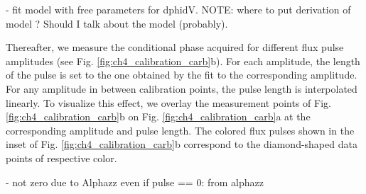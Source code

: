 - fit model with free parameters for dphidV. NOTE: where to put derivation of model ? Should I talk about the model (probably).

Thereafter, we measure the conditional phase acquired for different flux pulse amplitudes (see Fig. \ref{fig:ch4_calibration_carb}b). For each amplitude, the length of the pulse is set to the one obtained by the fit to the corresponding amplitude. For any amplitude in between calibration points, the pulse length is interpolated linearly. 
To visualize this effect, we overlay the measurement points of Fig. \ref{fig:ch4_calibration_carb}b on Fig. \ref{fig:ch4_calibration_carb}a at the corresponding amplitude and pulse length. The colored flux pulses shown in the inset of Fig. \ref{fig:ch4_calibration_carb}b correspond to the diamond-shaped data points of respective color.

- not zero due to Alphazz even if pulse == 0: from alphazz

